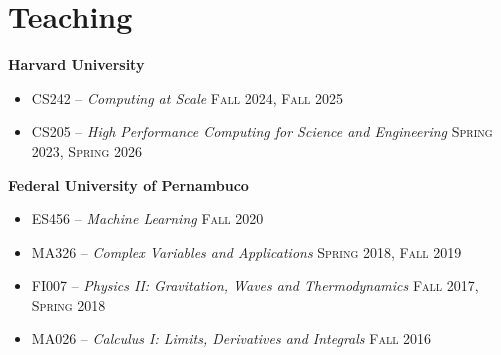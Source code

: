 \documentclass[letterpaper,10pt]{article}
\newcommand{\entry}[4]{

\begin{minipage}[t]{.15\textwidth}
\end{minipage}
\hfill\vline\hfill 
\begin{minipage}[t]{0.95\textwidth}
#2 \hfill \textsc{#1}

\textit{#3}

\footnotesize{#4}
\end{minipage}\\\vspace{.25cm}}
\newcommand{\harv}{Harvard University}
\newcommand{\ufpe}{Federal University of Pernambuco}
\newcommand{\mycomment}[1]{}
\begin{document}
\vspace*{-.25cm}
\section{Teaching}
\textbf{\harv}
\vspace{-0.5em}
\begin{itemize}[label={}]
    \setlength\itemsep{0.1em}
	\item CS242 -- \textit{Computing at Scale} \hfill\textsc{Fall 2024, Fall 2025}
	\item CS205 -- \textit{High Performance Computing for Science and Engineering} \hfill\textsc{Spring 2023, Spring 2026}
\end{itemize}
\hspace{1.5em}\textbf{\ufpe} 
\vspace{-0.5em}
\begin{itemize}[label={}]
    \setlength\itemsep{0.1em}
    \item ES456 -- \textit{Machine Learning} \hfill\textsc{Fall 2020}
    \item MA326 -- \textit{Complex Variables and Applications} \hfill\textsc{Spring 2018, Fall 2019}
    \item FI007 -- \textit{Physics II: Gravitation, Waves and Thermodynamics} \hfill\textsc{Fall 2017, Spring 2018}
    \item MA026 -- \textit{Calculus I: Limits, Derivatives and Integrals} \hfill\textsc{Fall 2016} 
\end{itemize}
\vspace*{-.25cm}
\mycomment{
\entry{Spring 2023}{CS205 -- \textbf{High Performance Computing} -- Teaching Fellow}{\harv}{
	I led lab activites, held office hours, assisted the teaching staff on grading assignments, and mentored some of the final projects.
	}

\entry{Fall 2020}{ES456 -- \textbf{Machine Learning} -- Teaching Assistant}{\ufpe}{
	I conducted my own activities and lectures off of my own syllabus. Supported the students developing projects and graded work.
	}

\entry{2018--2019}{MA326 -- \textbf{Complex Variables and Applications} -- Teaching Assistant}{\ufpe}{
	I taught once-a-week sessions to support students in their assignments.
	}

\entry{2017--2018}{FI007 -- \textbf{Physics II: Gravitation, Waves and Thermodynamics} -- Teaching Assistant}{\ufpe}{
	I wrote some extra assignments for students interested in Olympic-level Physics, as well as once-a-week sessions to discuss.
	}

\entry{Fall 2016}{MA026 -- \textbf{Calculus I: Limits, Derivatives and Integrals} -- Teaching Assistant}{\ufpe}{
	I taught once-a-week sessions to support students in their assignments.
	}
}
\end{document}
